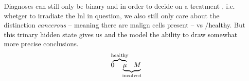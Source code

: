 \documentclass[\relativeRoot/main.tex]{subfiles}
\begin{document}
Diagnoses can still only be binary and in order to decide on a treatment , i.e. whetger to irradiate the \gls{lnl} in question, we also still only care about the distinction \emph{cancerous} -- meaning there are malign cells present -- vs /healthy. But this trinary hidden state gives us and the model the ability to draw somewhat more precise conclusions.
\begin{equation}
  \rlap{$\overbrace{\phantom{0 \quad \mu}}^\text{healthy}$} 0 \quad
  \underbrace{\mu \quad M}_\text{involved}
\end{equation}
%
\end{document}
